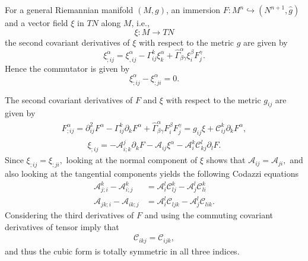 \documentclass{amsart}
\theoremstyle{definition}
\theoremstyle{remark}
\numberwithin{equation}{section}
\begin{document}
For a general Riemannian manifold $(M,g)$, an immersion $F\colon M^n\hookrightarrow (N^{n+1},\hat{g})$ and a vector field $\xi$ in $TN$ along $M$, i.e.,
\[
\xi\colon M\rightarrow TN
\]
the second covariant derivatives of $\xi$ with respect to the metric $g$ are given by
\[
\xi^{ \alpha}_{;ij}=\xi^{ \alpha }_{,ij}-\Gamma_{ij}^k\xi^{ \alpha }_k+\hat{\Gamma}^{ \alpha }_{\beta\gamma}\xi^{\beta}_iF^{\gamma}_j.
\]
Hence the commutator is given by
\[
\xi_{;ij}^{ \alpha }-\xi_{;ji}^{ \alpha }=0.
\]


The second covariant derivatives of $F$ and $ \xi$ with respect to the metric $g_{ij}$ are given by
\begin{align}
F_{;ij}^{\alpha}=\partial^2_{ij}F^{\alpha}-\Gamma_{ij}^k\partial_kF^{\alpha}+\hat{\Gamma}^{ \alpha }_{\beta\gamma}F^{\beta}_iF^{\gamma}_j=g_{ij}\xi+\mathcal{C}_{ij}^k\partial_kF^{\alpha},
\end{align}
\begin{align}
\xi_{;ij}=-\mathcal{A}_{i;k}^j\partial_kF-\mathcal{A}_{ij}\xi^{\alpha}-\mathcal{A}_i^k\mathcal{C}_{kj}^l\partial_lF.
\end{align}
Since $\xi_{;ij}=\xi_{;ji},$ looking at the normal component of $\xi$ shows that $\mathcal{A}_{ij}=\mathcal{A}_{ji},$ and also looking at the tangential components yields the following Codazzi equations
\begin{align}
\mathcal{A}^k_{j;i}-\mathcal{A}^k_{i;j}&=\mathcal{A}_i^l\mathcal{C}_{lj}^k-\mathcal{A}^l_j\mathcal{C}_{li}^k\\
\mathcal{A}_{jk;i}-\mathcal{A}_{ik;j}&=\mathcal{A}_i^l\mathcal{C}_{ljk}-\mathcal{A}_j^l\mathcal{C}_{lik}.
\end{align}
Considering the third derivatives of $F$ and using the  commuting covariant derivatives of tensor imply that
\begin{align}
\mathcal{C}_{ikj}=\mathcal{C}_{ijk},
\end{align}
and thus the cubic form is totally symmetric in all three indices. %
\end{document}
